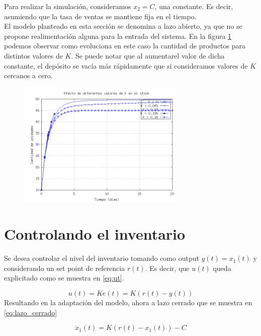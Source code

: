 \documentclass{sig-alternate}
\begin{document}
Para realizar la simulación, consideramos $x_{2} = C$, una constante. Es decir, asumiendo que la tasa de ventas se mantiene fija en el tiempo.\\
El modelo planteado en esta sección se denomina a lazo abierto, ya que no se propone realimentación alguna para la entrada del sistema. 
En la figura \ref{fig:lazo_abierto} podemos observar como evoluciona en este caso la cantidad de productos para distintos valores de $K$. 
Se puede notar que al aumentarel valor de dicha constante, el depósito se vacía más rápidamente que si consideramos valores de $K$ cercanos a
cero.

\begin{figure}[h]
\begin{center}
\includegraphics[width=8cm]{../src/k_plot.png}
\caption{\label{fig:lazo_abierto} }
\end{center}
\end{figure}

\section{Controlando el inventario}
\label{inventary_control_section} 
Se desea controlar el nivel del inventario tomando como output $y(t)=x_{1}(t)$ y considerando
un set point de referencia $r(t)$. Es decir, que $u(t)$ queda explicitado como se muestra en \eqref{eq:ut}.

\begin{equation}
u(t)= Ke(t) = K(r(t)-y(t))\label{eq:ut}\end{equation}
Resultando en la adaptación del modelo, ahora a lazo cerrado que se muestra en \eqref{eq:lazo_cerrado}

\begin{equation}
\dot{x}_1(t) = K(r(t) - x_{1}(t)) - C\label{eq:lazo_cerrado}\end{equation}
\end{document}
